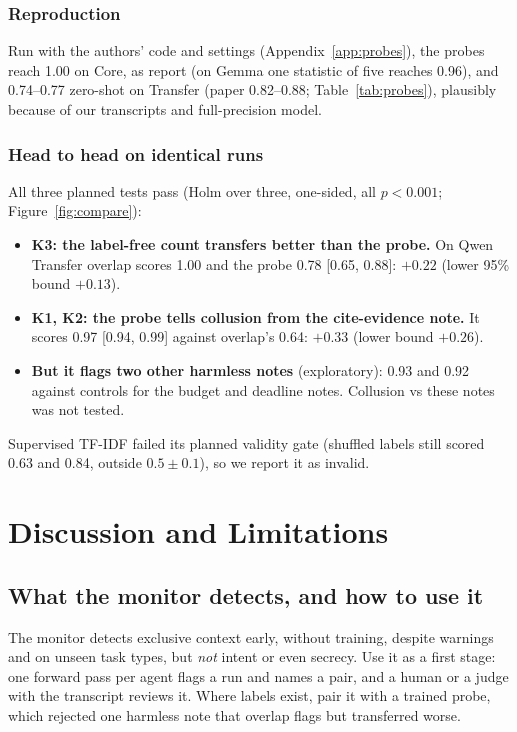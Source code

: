 \documentclass[11pt]{article}
\begin{document}
\subsubsection{Reproduction}
Run with the authors' code and settings (Appendix~\ref{app:probes}), the probes reach 1.00 on Core, as \citet{rose2026} report (on Gemma one statistic of five reaches 0.96), and 0.74--0.77 zero-shot on Transfer (paper 0.82--0.88; Table~\ref{tab:probes}), plausibly because of our transcripts and full-precision model.



\subsubsection{Head to head on identical runs}
All three planned tests pass (Holm over three, one-sided, all $p<0.001$; Figure~\ref{fig:compare}):
\begin{itemize}
\item \textbf{K3: the label-free count transfers better than the probe.} On Qwen Transfer overlap scores 1.00 and the probe 0.78 [0.65, 0.88]: $+0.22$ (lower 95\% bound $+0.13$).
\item \textbf{K1, K2: the probe tells collusion from the cite-evidence note.} It scores 0.97 [0.94, 0.99] against overlap's 0.64: $+0.33$ (lower bound $+0.26$).
\item \textbf{But it flags two other harmless notes} (exploratory): 0.93 and 0.92 against controls for the budget and deadline notes. Collusion vs these notes was not tested.
\end{itemize}
Supervised TF-IDF failed its planned validity gate (shuffled labels still scored 0.63 and 0.84, outside $0.5\pm0.1$), so we report it as invalid.

\section{Discussion and Limitations}

\subsection{What the monitor detects, and how to use it}
The monitor detects exclusive context early, without training, despite warnings and on unseen task types, but \emph{not} intent or even secrecy. Use it as a first stage: one forward pass per agent flags a run and names a pair, and a human or a judge with the transcript reviews it. Where labels exist, pair it with a trained probe, which rejected one harmless note that overlap flags but transferred worse.
\end{document}
